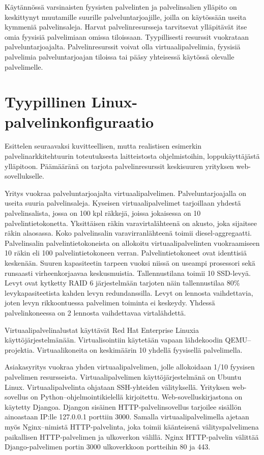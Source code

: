 Käytännössä varsinaisten fyysisten palvelinten ja palvelinsalien ylläpito on keskittynyt muutamille suurille palveluntarjoajille, joilla on käytössään useita kymmeniä palvelinsaleja. Harvat palvelinresursseja tarvitsevat ylläpitävät itse omia fyysisiä palvelimiaan omissa tiloissaan. Tyypillisesti resurssit vuokrataan palveluntarjoajalta. Palvelinresurssit voivat olla virtuaalipalvelimia, fyysisiä palvelimia palveluntarjoajan tiloissa tai pääsy yhteisessä käytössä olevalle palvelimelle.~\cite{portnoy2016virtualization}

\section{Tyypillinen Linux-palvelinkonfiguraatio}\label{tyypillinen_palvelinkonfiguraatio}

    Esittelen seuraavaksi kuvitteellisen, mutta realistisen esimerkin palvelinarkkitehtuurin toteutuksesta laitteistosta ohjelmistoihin, loppukäyttäjästä ylläpitoon. Päämääränä on tarjota palvelinresurssit keskisuuren yrityksen web-sovellukselle.

    Yritys vuokraa palveluntarjoajalta virtuaalipalvelimen. Palveluntarjoajalla on useita suuria palvelinsaleja. Kyseisen virtuaalipalvelimet tarjoillaan yhdestä palvelinsalista, jossa on 100 kpl räkkejä, joissa jokaisessa on 10 palvelintietokonetta. Yksittäisen räkin varavirtalähteenä on akusto, joka sijaitsee räkin alaosassa. Koko palvelinsalin varavirranlähteenä toimii diesel-aggregaatti. Palvelinsalin palvelintietokoneista on allokoitu virtuaalipalvelinten vuokraamiseen 10 räkin eli 100 palvelintietokoneen verran. Palvelintietokoneet ovat identtisiä keskenään. Suuren kapasiteetin tarpeen vuoksi niissä on useampi prosessori sekä runsaasti virheenkorjaavaa keskusmuistia. Tallennustilana toimii 10 SSD-levyä. Levyt ovat kytketty RAID 6 järjestelmään tarjoten näin tallennustilaa 80\% levykapasiteetista kahden levyn redundanssilla. Levyt on lennosta vaihdettavia, joten levyn rikkoontuessa palvelimen toiminta ei keskeydy. Yhdessä palvelinkoneessa on 2 lennosta vaihdettavaa virtalähdettä.

    Virtuaalipalvelinalustat käyttävät Red Hat Enterprise Linuxia käyttöjärjestelmänään. Virtualisointiin käytetään vapaan lähdekoodin QEMU–projektia. Virtuaalikoneita on keskimäärin 10 yhdellä fyysisellä palvelimella.

    Asiakasyritys vuokraa yhden virtuaalipalvelimen, jolle allokoidaan 1/10 fyysisen palvelimen resursseista. Virtuaalipalvelimen käyttöjärjestelmänä on Ubuntu Linux. Virtuaalipalvelinta ohjataan SSH-yhteiden välityksellä. Yrityksen web-sovellus on Python–ohjelmointikielellä kirjoitettu. Web-sovelluskirjastona on käytetty Djangoa. Djangon sisäinen HTTP-palvelinsovellus tarjoilee sisällön ainoastaan IP:lle 127.0.0.1 porttiin 3000. Samalla virtuaalipalvelimella ajetaan myös Nginx–nimistä HTTP-palvelinta, joka toimii käänteisenä välityspalvelimena paikallisen HTTP-palvelimen ja ulkoverkon välillä. Nginx HTTP-palvelin välittää Django-palvelimen portin 3000 ulkoverkkoon portteihin 80 ja 443.

